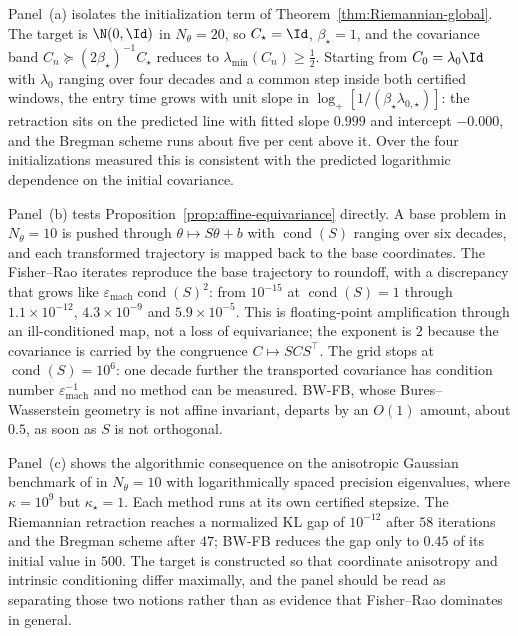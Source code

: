 Panel~(a) isolates the initialization term of
Theorem~\ref{thm:Riemannian-global}. The target is $\N(0,\Id)$ in $N_\theta=20$,
so $C_\star=\Id$, $\beta_\star=1$, and the covariance band
$C_n\succeq(2\beta_\star)^{-1}C_\star$ reduces to
$\lambda_{\min}(C_n)\geq\frac12$. Starting from $C_0=\lambda_0\Id$ with
$\lambda_0$ ranging over four decades and a common step inside both certified
windows, the entry time grows with unit slope in
$\log_+[1/(\beta_\star\lambda_{0,\star})]$: the retraction sits on the predicted
line with fitted slope $0.999$ and intercept $-0.000$, and the Bregman scheme
runs about five per cent above it. Over the four initializations measured this is
consistent with the predicted logarithmic dependence on the initial covariance.

Panel~(b) tests Proposition~\ref{prop:affine-equivariance} directly. A base
problem in $N_\theta=10$ is pushed through $\theta\mapsto S\theta+b$ with
$\operatorname{cond}(S)$ ranging over six decades, and each transformed
trajectory is mapped back to the base coordinates. The Fisher--Rao iterates
reproduce the base trajectory to roundoff, with a discrepancy that grows like
$\varepsilon_{\mathrm{mach}}\operatorname{cond}(S)^2$: from $10^{-15}$ at
$\operatorname{cond}(S)=1$ through $1.1\times10^{-12}$, $4.3\times10^{-9}$ and $5.9\times10^{-5}$. This is
floating-point amplification through an ill-conditioned map, not a loss of
equivariance; the exponent is $2$ because the covariance is carried by the
congruence $C\mapsto SCS^{\!\top}$. The grid stops at
$\operatorname{cond}(S)=10^{6}$: one decade further the transported covariance
has condition number $\varepsilon_{\mathrm{mach}}^{-1}$ and no method can be
measured. BW-FB, whose Bures--Wasserstein geometry is not affine invariant,
departs by an $O(1)$ amount, about $0.5$, as soon as $S$ is not orthogonal.

Panel~(c) shows the algorithmic consequence on the anisotropic Gaussian
benchmark of \cite{diao2023forward} in $N_\theta=10$ with logarithmically spaced
precision eigenvalues, where $\kappa=10^{9}$ but $\kappa_\star=1$. Each method
runs at its own certified stepsize. The Riemannian retraction reaches a
normalized KL gap of $10^{-12}$ after $58$ iterations and the Bregman scheme after
$47$; BW-FB reduces the gap only to $0.45$ of its initial value in $500$. The target is constructed so that coordinate
anisotropy and intrinsic conditioning differ maximally, and the panel should be
read as separating those two notions rather than as evidence that Fisher--Rao
dominates in general.


